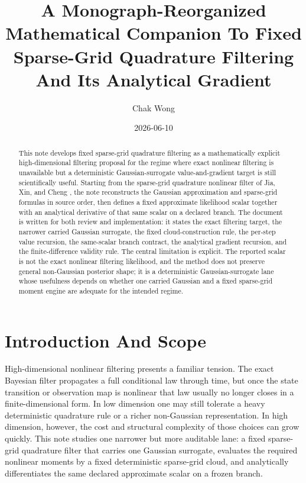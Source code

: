 \documentclass[11pt]{article}
\title{A Monograph-Reorganized Mathematical Companion To Fixed Sparse-Grid Quadrature Filtering And Its Analytical Gradient}
\author{Chak Wong}
\date{2026-06-10}
\numberwithin{equation}{section}
\begin{document}
\maketitle

\begin{abstract}
This note develops fixed sparse-grid quadrature filtering as a
mathematically explicit high-dimensional filtering proposal for the regime where
exact nonlinear filtering is unavailable but a deterministic Gaussian-surrogate
value-and-gradient target is still scientifically useful.  Starting from the
sparse-grid quadrature nonlinear filter of Jia, Xin, and Cheng
\cite{jia2012sparsegrid}, the note reconstructs the Gaussian approximation and
sparse-grid formulas in source order, then defines a fixed approximate
likelihood scalar together with an analytical derivative of that same scalar on
a declared branch.  The document is written for both review and implementation:
it states the exact filtering target, the narrower carried Gaussian surrogate,
the fixed cloud-construction rule, the per-step value recursion, the
same-scalar branch contract, the analytical gradient recursion, and the
finite-difference validity rule.  The central limitation is explicit.  The
reported scalar is not the exact nonlinear filtering likelihood, and the method
does not preserve general non-Gaussian posterior shape; it is a deterministic
Gaussian-surrogate lane whose usefulness depends on whether one carried Gaussian
and a fixed sparse-grid moment engine are adequate for the intended regime.
\end{abstract}

\section{Introduction And Scope}
\label{sec:p33-reader-orientation}

High-dimensional nonlinear filtering presents a familiar tension.  The exact
Bayesian filter propagates a full conditional law through time, but once the
state transition or observation map is nonlinear that law usually no longer
closes in a finite-dimensional form.  In low dimension one may still tolerate a
heavy deterministic quadrature rule or a richer non-Gaussian representation.  In
high dimension, however, the cost and structural complexity of those choices can
grow quickly.  This note studies one narrower but more auditable lane: a fixed
sparse-grid quadrature filter that carries one Gaussian surrogate, evaluates the
required nonlinear moments by a fixed deterministic sparse-grid cloud, and
analytically differentiates the same declared approximate scalar on a frozen
branch.
\end{document}
